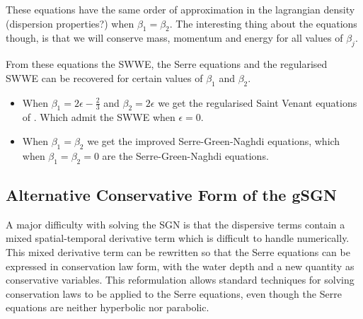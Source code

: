 \documentclass[10pt]{article}
\begin{document}
These equations have the same order of approximation in the lagrangian density (dispersion properties?) when $\beta_1 = \beta_2$. The interesting thing about the equations though, is that we will conserve mass, momentum and energy for all values of $\beta_j$. 

From these equations the SWWE, the Serre equations and the regularised SWWE \cite{Clamond-Dutykh-2018-237} can be recovered for certain values of $\beta_1$ and $\beta_2$. 

\begin{itemize}
	\item When $\beta_1 = 2\epsilon -\frac{2}{3}$ and $\beta_2 = 2 \epsilon$ we get the regularised Saint Venant equations of \cite{Clamond-Dutykh-2018-237}. Which admit the SWWE when $\epsilon = 0$. 
	\item When $\beta_1 = \beta_2$ we get the improved Serre-Green-Naghdi equations, which when $\beta_1 =\beta_2 = 0$ are the Serre-Green-Naghdi equations. 
\end{itemize}

\subsection{Alternative Conservative Form of the gSGN}

A major difficulty with solving the SGN is that the dispersive terms contain a mixed spatial-temporal derivative term which is difficult to handle numerically. This mixed derivative term can be rewritten  so that the Serre equations can be expressed in conservation law form, with the water depth and a new quantity as conservative variables. This reformulation allows standard techniques for solving conservation laws to be applied to the Serre equations, even though the Serre equations are neither hyperbolic nor parabolic.
\end{document}
